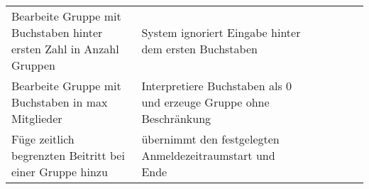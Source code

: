 \begin{table}[]
\begin{tabular}{p{6cm}p{7cm}p{3cm}llll}
		Bearbeite Gruppe mit Buchstaben hinter ersten Zahl in Anzahl Gruppen                                                                 & System ignoriert Eingabe hinter dem ersten Buchstaben                                                                                                           & \checkmark           &  &  &  \\
		Bearbeite Gruppe mit Buchstaben in max Mitglieder                                                                                    & Interpretiere Buchstaben als 0 und erzeuge Gruppe ohne Beschränkung                                                                                                & \checkmark           &  &  &  \\
		Füge zeitlich begrenzten Beitritt bei einer Gruppe hinzu                                                                              & übernimmt den festgelegten Anmeldezeitraumstart und Ende                                                                                                         & \checkmark           &  &  &  \\
	
		
	\end{tabular}
\end{table}
